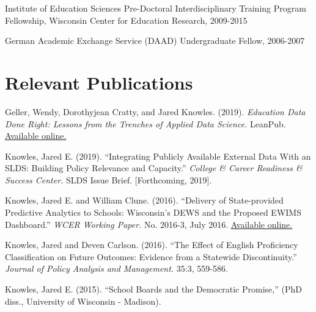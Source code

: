 \documentclass[margin,line]{res}
\begin{document}
\begin{resume}
\vspace*{-2.5mm}

Institute of Education Sciences Pre-Doctoral Interdisciplinary Training Program 
Fellowship, Wisconsin Center for Education Research, 2009-2015

\vspace*{-2.5mm}
German Academic Exchange Service (DAAD) Undergraduate Fellow, 2006-2007

\vspace*{-3mm}
\section{\sc Relevant Publications}

Geller, Wendy, Dorothyjean Cratty, and Jared Knowles. (2019). \emph{Education Data Done Right: Lessons from the Trenches of Applied Data Science.} LeanPub. \href{http://www.eddatadoneright.com}{Available online.}

Knowles, Jared E. (2019). ``Integrating Publicly Available External Data With an SLDS: Building 
Policy Relevance and Capacity.'' \emph{College & Career Readiness & Success Center.} 
SLDS Issue Brief. [Forthcoming, 2019].

Knowles, Jared E. and William Clune. (2016). ``Delivery of State-provided Predictive
Analytics to Schools: Wisconsin’s DEWS and the Proposed EWIMS Dashboard.'' 
\emph{WCER Working Paper.} No. 2016-3, July 2016. \href{http://wcer-web.ad.education.wisc.edu/docs/working-papers/Working_Paper_No_2016_03.pdf}{Available online.}

Knowles, Jared and Deven Carlson. (2016). ``The Effect of English Proficiency Classification on Future Outcomes: 
Evidence from a Statewide Discontinuity.'' \emph{Journal of Policy Analysis and Management.}
35:3, 559-586. 

Knowles, Jared E. (2015). ``School Boards and the Democratic Promise,'' (PhD diss., University of 
Wisconsin - Madison).


\end{resume}
\end{document}
